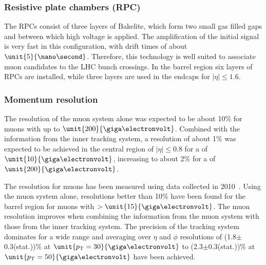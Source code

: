\subsubsection*{Resistive plate chambers (RPC)}
The RPCs consist of three layers of Bakelite, which form two small gas filled gaps and between which high voltage is applied. The amplification of the initial signal is very fast in this configuration, with drift times of about $\unit{5}{\nano\second}$. Therefore, this technology is well suited to associate muon candidates to the LHC bunch crossings. In the barrel region six layers of RPCs are installed, while three layers are used in the endcaps for $\vert\eta\vert \leq 1.6$.
\subsubsection*{Momentum resolution}
The \pt resolution of the muon system alone was expected to be about 10\% for muons with \pt up to $\unit{200}{\giga\electronvolt}$. Combined with the information from the inner tracking system, a resolution of about 1\% was expected to be achieved in the central region of $\vert\eta\vert \leq 0.8$ for a \pt of $\unit{10}{\giga\electronvolt}$, increasing to about 2\% for a \pt of $\unit{200}{\giga\electronvolt}$.

The \pt resolution for muons has been measured using data collected in 2010~\cite{MUO-10-004}. Using the muon system alone, resolutions better than 10\% have been found for the barrel region for muons with \pt $> \unit{15}{\giga\electronvolt}$. The muon resolution improves when combining the information from the muon system with those from the inner tracking system. The precision of the tracking system dominates for a wide \pt range and averaging over $\eta$ and $\phi$ resolutions of (1.8$\pm$0.3(stat.))\% at $\unit{\pt = 30}{\giga\electronvolt}$ to (2.3$\pm$0.3(stat.))\% at $\unit{\pt = 50}{\giga\electronvolt}$ have been achieved.
